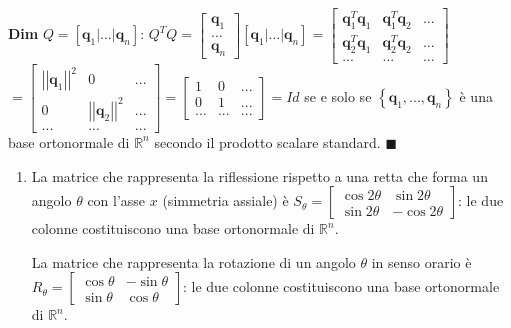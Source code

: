 \documentclass{article}
\begin{document}
\textbf{Dim} $Q=\left[ \mathbf{q}_{1}|...|\mathbf{q}_{n}\right] $: $Q^{T}Q=%
\left[ 
\begin{array}{c}
\mathbf{q}_{1} \\ 
... \\ 
\mathbf{q}_{n}%
\end{array}%
\right] \left[ \mathbf{q}_{1}|...|\mathbf{q}_{n}\right] =\left[ 
\begin{array}{ccc}
\mathbf{q}_{1}^{T}\mathbf{q}_{1} & \mathbf{q}_{1}^{T}\mathbf{q}_{2} & ... \\ 
\mathbf{q}_{2}^{T}\mathbf{q}_{1} & \mathbf{q}_{2}^{T}\mathbf{q}_{2} & ... \\ 
... & ... & ...%
\end{array}%
\right] $ $=\left[ 
\begin{array}{ccc}
\left\vert \left\vert \mathbf{q}_{1}\right\vert \right\vert ^{2} & 0 & ...
\\ 
0 & \left\vert \left\vert \mathbf{q}_{2}\right\vert \right\vert ^{2} & ...
\\ 
... & ... & ...%
\end{array}%
\right] =\left[ 
\begin{array}{ccc}
1 & 0 & ... \\ 
0 & 1 & ... \\ 
... & ... & ...%
\end{array}%
\right] =Id$ se e solo se $\left\{ \mathbf{q}_{1},...,\mathbf{q}_{n}\right\} 
$ \`{e} una base ortonormale di $%
\mathbb{R}
^{n}$ secondo il prodotto scalare standard. $\blacksquare $

\begin{enumerate}
\item La matrice che rappresenta la riflessione rispetto a una retta che
forma un angolo $\theta $ con l'asse $x$ (simmetria assiale) \`{e} $%
S_{\theta }=\left[ 
\begin{array}{cc}
\cos 2\theta & \sin 2\theta \\ 
\sin 2\theta & -\cos 2\theta%
\end{array}%
\right] $: le due colonne costituiscono una base ortonormale di $%
\mathbb{R}
^{n}$.

La matrice che rappresenta la rotazione di un angolo $\theta $ in senso
orario \`{e} $R_{\theta }=\left[ 
\begin{array}{cc}
\cos \theta & -\sin \theta \\ 
\sin \theta & \cos \theta%
\end{array}%
\right] $: le due colonne costituiscono una base ortonormale di $%
\mathbb{R}
^{n}$.
\end{enumerate}
\end{document}
